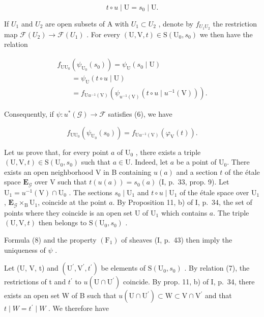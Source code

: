 \[
t \circ u \mid \mathrm{U} = s _ {0} \mid \mathrm{U}.\tag{7}
\]

If \(U_{1}\) and \(U_{2}\) are open subsets of A with \(U_{1} \subset U_{2}\) , denote by \(f_{U_{1}U_{2}}\) the restriction map \(\mathcal{F}(U_{2}) \to \mathcal{F}(U_{1})\) . For every \((\mathrm{U}, \mathrm{V}, t) \in \mathrm{S}(\mathrm{U}_{0}, s_{0})\) we then have the relation

\[
\begin{array}{l} f_{\mathrm{U}\mathrm{U}_{0}}(\psi_{\mathrm{U}_{0}}(s_{0})) = \psi_{\mathrm{U}}(s_{0} \mid \mathrm{U}) \\ \qquad = \psi_{\mathrm{U}}(t \circ u \mid \mathrm{U}) \\ \qquad = f_{\mathrm{U}u^{-1}(\mathrm{V})}(\psi_{u^{-1}(\mathrm{V})}(t \circ u \mid u^{-1}(\mathrm{V}))). \end{array}
\]

Consequently, if \(\psi \colon u^{*}(\mathcal{G})\to \mathcal{F}\) satisfies (6), we have

\[
f_{\mathrm{U}\mathrm{U}_{0}}(\psi_{\mathrm{U}_{0}}(s_{0})) = f_{\mathrm{U}u^{-1}(\mathrm{V})}(\varphi_{\mathrm{V}}(t)).\tag{8}
\]

Let us prove that, for every point \(a\) of \(\mathrm{U}_0\) , there exists a triple \((\mathrm{U},\mathrm{V},t)\in \mathrm{S}(\mathrm{U}_0,s_0)\) such that \(a\in \mathrm{U}\). Indeed, let \(a\) be a point of \(\mathrm{U}_0\). There exists an open neighborhood V in B containing \(u(a)\) and a section \(t\) of the étale space \(\mathbf{E}_{\mathcal{G}}\) over V such that \(t(u(a)) = s_0(a)\) (I, p.~33, prop. 9). Let \(\mathrm{U}_1 = u^{-1} (\mathrm{V})\cap \mathrm{U}_0\) . The sections \(s_0\mid \mathrm{U}_1\) and \(t\circ u\mid \mathrm{U}_1\) of the étale space over \(\mathrm{U}_1\), \(\mathbf{E}_{\mathcal{G}}\times_{\mathrm{B}}\mathrm{U}_1\), coincide at the point \(a\). By Proposition 11, b) of I, p.~34, the set of points where they coincide is an open set U of \(\mathrm{U}_1\) which contains \(a\). The triple \((\mathrm{U},\mathrm{V},t)\) then belongs to \(\mathrm{S}(\mathrm{U}_0,s_0)\) .

Formula (8) and the property \((\mathrm{F}_{1})\) of sheaves (I, p.~43) then imply the uniqueness of \(\psi\) .

Let (U, V, t) and \((\mathrm{U}^{\prime}, \mathrm{V}^{\prime}, t^{\prime})\) be elements of \(\mathrm{S}(\mathrm{U}_{0}, s_{0})\) . By relation (7), the restrictions of t and \(t^{\prime}\) to \(u(\mathrm{U} \cap \mathrm{U}^{\prime})\) coincide. By prop. 11, b) of I, p.~34, there exists an open set W of B such that \(u(\mathrm{U} \cap \mathrm{U}^{\prime}) \subset \mathrm{W} \subset \mathrm{V} \cap \mathrm{V}^{\prime}\) and that \(t \mid W = t^{\prime} \mid W\) . We therefore have

